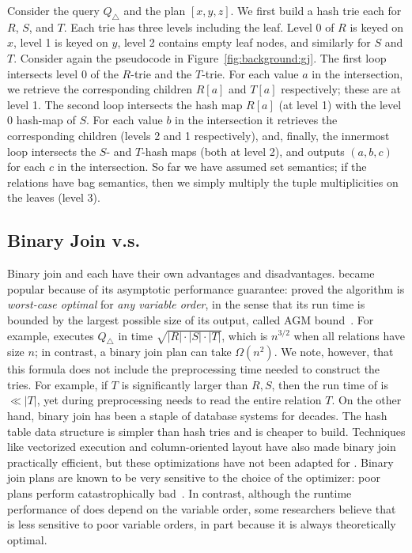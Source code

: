 \begin{example}
  Consider the query $Q_\triangle$ and the \GJ plan $[x, y, z]$.  We
  first build a hash trie each for $R$, $S$, and $T$.  Each trie has
  three levels including the leaf.  Level 0 of $R$ is keyed on $x$,
  level 1 is keyed on $y$, level 2 contains empty leaf nodes, and
  similarly for $S$ and $T$.  Consider again the pseudocode in
  Figure~\ref{fig:background:gj}.  The first loop intersects level 0
  of the $R$-trie and the $T$-trie.  For each value $a$ in the
  intersection, we retrieve the corresponding children $R[a]$ and
  $T[a]$ respectively; these are at level 1.  The second loop
  intersects the hash map $R[a]$ (at level 1) with the level 0
  hash-map of $S$.  For each value $b$ in the intersection it
  retrieves the corresponding children (levels 2 and 1 respectively),
  and, finally, the innermost loop intersects the $S$- and $T$-hash
  maps (both at level 2), and outputs $(a,b,c)$ for each $c$ in the
  intersection.  So far we have assumed set semantics; if the
  relations have bag semantics, then we simply multiply the tuple
  multiplicities on the leaves (level 3).
\end{example}


\subsection{Binary Join v.s. \GJ}
Binary join and \GJ each have their own advantages and disadvantages.
\GJ became popular because of its asymptotic performance guarantee:
\citet{DBLP:journals/sigmod/NgoRR13} proved the algorithm is
\emph{worst-case optimal} for \emph{any variable order}, in the sense
that its run time is bounded by the largest possible size of its
output, called AGM bound~\cite{DBLP:journals/siamcomp/AtseriasGM13}.
For example, \GJ executes $Q_\triangle$ in time
$\sqrt{|R|\cdot |S| \cdot |T|}$, which is $n^{3/2}$ when all relations
have size $n$; in contrast, a binary join plan can take $\Omega(n^2)$.
We note, however, that this formula does not include the preprocessing
time needed to construct the tries.  For example, if $T$ is
significantly larger than $R, S$, then the run time of \GJ is
$\ll |T|$, yet during preprocessing \GJ needs to read the entire
relation $T$.  On the other hand, binary join has been a staple of
database systems for decades.  The hash table data structure is
simpler than hash tries and is cheaper to build.  Techniques like
vectorized execution and column-oriented layout have also made binary
join practically efficient, but these optimizations have not been
adapted for \GJ.  Binary join plans are known to be very sensitive to
the choice of the optimizer: poor plans perform catastrophically
bad~\cite{DBLP:journals/pvldb/LeisGMBK015}.  In contrast, although the
runtime performance of \GJ does depend on the variable order, some
researchers believe that \GJ is less sensitive to poor variable
orders, in part because it is always theoretically optimal.


